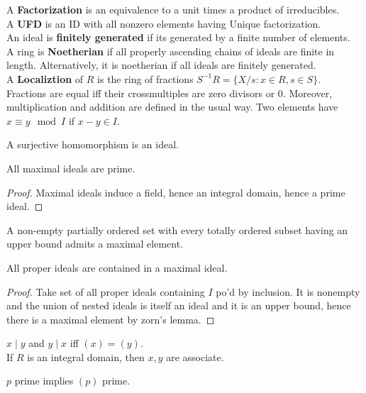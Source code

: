 \begin{definition}[Rings]
	A \textbf{Factorization} is an equivalence to a unit times a product of irreducibles.\\
	A \textbf{UFD} is an ID with all nonzero elements having Unique factorization.\\
	An ideal is \textbf{finitely generated} if its generated by a finite number of elements.\\
	A ring is \textbf{Noetherian} if all properly ascending chains of ideals are finite in length. Alternatively, it is noetherian if all ideals are finitely generated.\\
	A \textbf{Localiztion} of \(R\) is the ring of fractions \(S^{-1} R = \{X / s : x \in R, s \in S\} \). Fractions are equal iff their crossmultiples are zero divisors or \(0\). Moreover, multiplication and addition are defined in the usual way.
	Two elements have \(x \equiv y \mod I\) if \(x - y \in I\).
\end{definition}
\begin{proposition}
	A surjective homomorphism is an ideal.
\end{proposition}
\begin{theorem}
	All maximal ideals are prime.
\end{theorem}
\begin{proof}
	Maximal ideals induce a field, hence an integral domain, hence a prime ideal.
\end{proof}
\begin{definition}
A non-empty partially ordered set with every totally ordered subset having an upper bound admits a maximal element.
\end{definition}
\begin{theorem}
All proper ideals are contained in a maximal ideal.
\end{theorem}
\begin{proof}
	Take set of all proper ideals containing \(I\) po'd by inclusion. It is nonempty and the union of nested ideals is itself an ideal and it is an upper bound, hence there is a maximal element by zorn's lemma.
\end{proof}
\begin{proposition}
	\(x \mid y\) and \(y \mid x\) iff \(\left( x \right)  = \left( y \right) \).\\
	If \(R\) is an integral domain, then \(x, y \)  are associate.
\end{proposition}
\begin{proposition}
\(p\) prime implies \(\left( p \right) \) 	prime.
\end{proposition}
